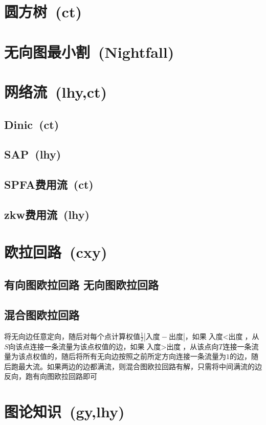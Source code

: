 \section{圆方树~\small(ct)}

\section{无向图最小割~\small(Nightfall)}

\section{网络流~\small(lhy,ct)}
    \subsection*{Dinic~\small(ct)}
    \subsection*{SAP~\small(lhy)}
    \subsection*{SPFA费用流~\small(ct)}
    \subsection*{zkw费用流~\small(lhy)}

\section{欧拉回路~\small(cxy)}
    \subsection*{有向图欧拉回路 无向图欧拉回路}
    \subsection*{混合图欧拉回路}
        将无向边任意定向，随后对每个点计算权值$ \frac{1}{2}| \text{入度} - \text{出度} |$，如果$ \text{入度} < \text{出度} $，从$ S $向该点连接一条流量为该点权值的边，如果$ \text{入度} > \text{出度} $，从该点向$ T $连接一条流量为该点权值的，随后将所有无向边按照之前所定方向连接一条流量为$ 1 $的边，随后跑最大流。如果两边的边都满流，则混合图欧拉回路有解，只需将中间满流的边反向，跑有向图欧拉回路即可

\section{图论知识~\small(gy,lhy)}
    
